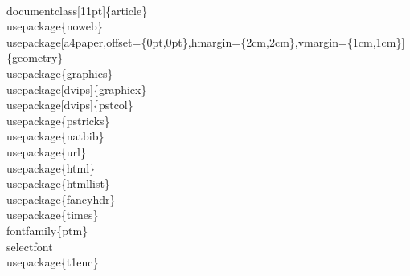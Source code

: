 \documentclass[11pt]{article}
\begin{document}
\nwenddocs{}\endmoddef
\\documentclass[11pt]\{article\}
%
%
%
\\usepackage\{noweb\}
\\usepackage[a4paper,offset=\{0pt,0pt\},hmargin=\{2cm,2cm\},vmargin=\{1cm,1cm\}]\{geometry\}
\\usepackage\{graphics\}
\\usepackage[dvips]\{graphicx\}
\\usepackage[dvips]\{pstcol\}
\\usepackage\{pstricks\}
\\usepackage\{natbib\}
\\usepackage\{url\}
\\usepackage\{html\}     
\\usepackage\{htmllist\} 
\\usepackage\{fancyhdr\} %
\\usepackage\{times\}\\fontfamily\{ptm\}\\selectfont
\\usepackage\{t1enc\}
\end{document}
